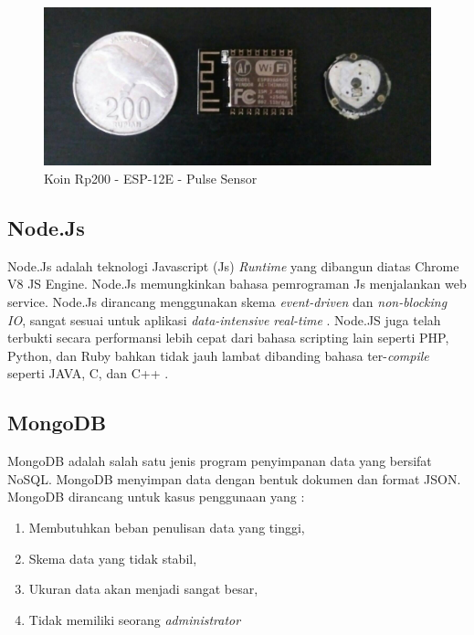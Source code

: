 \begin{figure}[H]
	\centering
	\includegraphics[scale=0.22]{images/coin_esp_pulse.jpg}
	\caption{Koin Rp200 - ESP-12E - Pulse Sensor}
	\label{fig:coin_esp_pulse}
\end{figure}

\subsection{Node.Js}
Node.Js adalah teknologi Javascript (Js) \textit{Runtime} yang dibangun diatas Chrome V8 JS Engine. Node.Js memungkinkan bahasa pemrograman Js menjalankan web service. Node.Js dirancang menggunakan skema \textit{event-driven} dan \textit{non-blocking IO}, sangat sesuai untuk aplikasi \textit{data-intensive real-time} \cite{nodejs}. Node.JS juga telah terbukti secara performansi lebih cepat dari bahasa scripting lain seperti PHP, Python, dan Ruby bahkan tidak jauh lambat dibanding bahasa ter-\textit{compile} seperti JAVA, C, dan C++ \cite{node_comparisson}.

\subsection{MongoDB}
MongoDB adalah salah satu jenis program penyimpanan data yang bersifat NoSQL. MongoDB menyimpan data dengan bentuk dokumen dan format JSON. MongoDB dirancang untuk kasus penggunaan yang \cite{why_mongo}:
\begin{enumerate}
	\item Membutuhkan beban penulisan data yang tinggi,
	\item Skema data yang tidak stabil,
	\item Ukuran data akan menjadi sangat besar,
	\item Tidak memiliki seorang \textit{administrator}
\end{enumerate}

